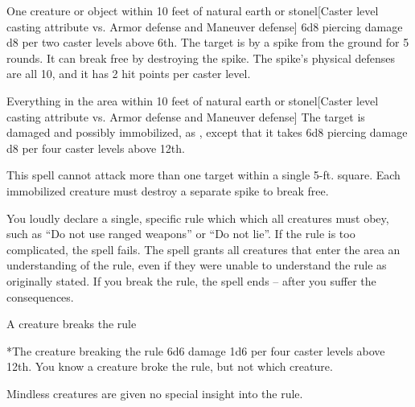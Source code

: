 \spellrng{\rngmed}
\begin{spelltarget}{One creature or object within 10 feet of natural earth or stone}l[Caster level \add casting attribute vs. Armor defense and Maneuver defense]
     6d8 piercing damage \add d8 per two caster levels above 6th.
     The target is \immobilized by a spike from the ground for 5 rounds. It can break free by destroying the spike. The spike's physical defenses are all 10, and it has 2 hit points per caster level.
\end{spelltarget}

\spellrng{\rngmed}
\begin{spelltargets}{Everything in the area within 10 feet of natural earth or stone}l[Caster level \add casting attribute vs. Armor defense and Maneuver defense]
    \spellsuccess The target is damaged and possibly immobilized, as , except that it takes 6d8 piercing damage \add d8 per four caster levels above 12th.
\end{spelltargets}
\spellnotes This spell cannot attack more than one target within a single 5-ft. square. Each immobilized creature must destroy a separate spike to break free.

\spelldur{\durshort}
\spellline
\spelleffect You loudly declare a single, specific rule which which all creatures must obey, such as ``Do not use ranged weapons'' or ``Do not lie''. If the rule is too complicated, the spell fails. The spell grants all creatures that enter the area an understanding of the rule, even if they were unable to understand the rule as originally stated. If you break the rule, the spell ends -- after you suffer the consequences.
\begin{spelltrigger}{A creature breaks the rule}
    \begin{spelltarget}*{The creature breaking the rule}
        \spelleffect 6d6 damage \add 1d6 per four caster levels above 12th. You know a creature broke the rule, but not which creature.
    \end{spelltarget}
\end{spelltrigger}
\spellnotes Mindless creatures are given no special insight into the rule.

